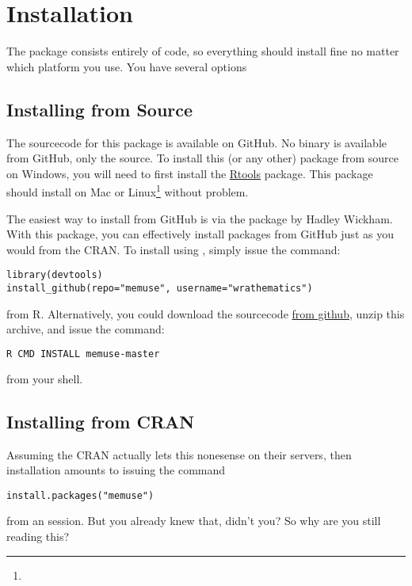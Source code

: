 \section{Installation}

The package consists entirely of  code, so everything should install fine no matter which platform you use.  You have several options 


\subsection{Installing from Source}

The sourcecode for this package is available on GitHub.  No binary is available from GitHub, only the source.  To install this (or any other) package from source on Windows, you will need to first install the \href{http://cran.r-project.org/bin/windows/Rtools/Rtools216.exe}{Rtools} package.  This package should install on Mac or Linux\footnote{\interject} without problem.

The easiest way to install  from GitHub is via the \href{http://cran.r-project.org/web/packages/devtools/index.html}{} package by Hadley Wickham.  With this package, you can effectively install packages from GitHub just as you would from the CRAN.  To install  using , simply issue the command:
\begin{lstlisting}[language=rr]
library(devtools)
install_github(repo="memuse", username="wrathematics")
\end{lstlisting}
from R.  Alternatively, you could download the sourcecode \href{https://github.com/wrathematics/memuse/archive/master.zip}{from github}, unzip this archive, and issue the command:
\begin{lstlisting}[language=sh]
R CMD INSTALL memuse-master
\end{lstlisting}
from your shell.


\subsection{Installing from CRAN}

Assuming the CRAN actually lets this nonesense on their servers, then installation amounts to issuing the command
\begin{lstlisting}[language=rr]
install.packages("memuse")
\end{lstlisting}
from an  session.  But you already knew that, didn't you?  So why are you still reading this?